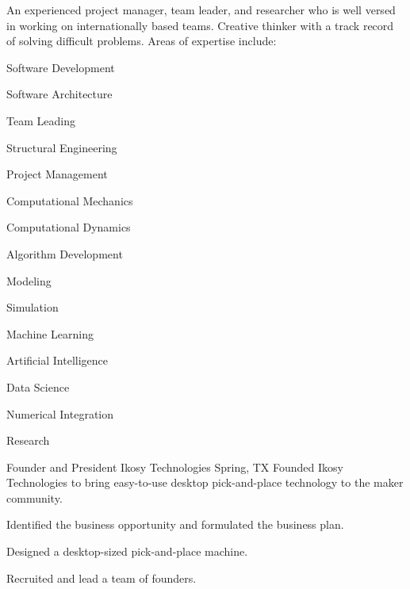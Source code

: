 \documentclass{leresume}
\begin{document}
	\thispagestyle{leempty}
	\makeresumeheaderC

	An experienced project manager, team leader, and researcher who is well versed in working on internationally based teams. Creative thinker with a track record of solving difficult problems. Areas of expertise include:
	\vspace{-4pt}
	\begin{multicols}{3}
		\begin{bulletedlist}
			
			\item Software Development
			\item Software Architecture
			\item Team Leading
			\item Structural Engineering
			\item Project Management
			\item Computational Mechanics
			\item Computational Dynamics
			\item Algorithm Development
			\item Modeling
			\item Simulation
			\item Machine Learning
			\item Artificial Intelligence
			\item Data Science
			\item Numerical Integration
			\item Research
		\end{bulletedlist}
	\end{multicols}

    
            {Founder and President}
            {Ikosy Technologies}
			{Spring, TX}
			Founded Ikosy Technologies to bring easy-to-use desktop pick-and-place technology to the maker community.
		\begin{bulletedlist}
			
		\item 
					Identified the business opportunity and formulated the business plan.
				
		\item 
					Designed a desktop-sized pick-and-place machine.
				
		\item 
					Recruited and lead a team of founders.
				
		\end{bulletedlist}
	
\end{document}
